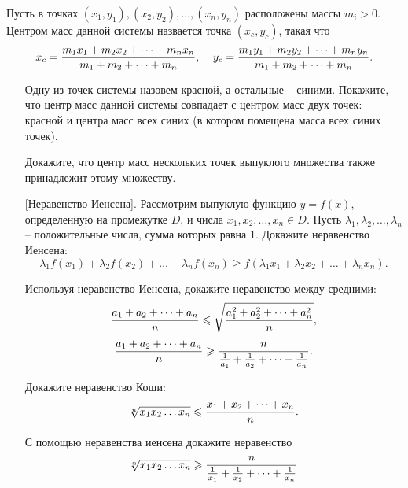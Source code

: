 \documentclass[a4paper,12pt,leqno]{article}
\begin{document}
	\begin{definition}
		Пусть в точках $(x_1, y_1), (x_2, y_2), \dots , (x_n, y_n)$ расположены массы $m_i > 0$. Центром масс данной системы назвается точка $(x_c, y_c)$, такая что
		$$x_c = {m_1x_1 + m_2x_2 + \dots + m_nx_n \over m_1 + m_2 + \dots + m_n},\;\;\;\; y_c = {m_1y_1 + m_2y_2 + \dots + m_ny_n \over m_1 + m_2 + \dots + m_n}.$$
	\end{definition}

	\begin{enumerate}
		\item[\z]  Одну из точек системы назовем красной, а остальные -- синими. Покажите, что центр масс данной системы совпадает с центром масс двух точек: красной и центра масс всех синих (в котором помещена масса всех синих точек).
		\item[\z] Докажите, что центр масс нескольких точек выпуклого множества также принадлежит этому множеству.
		\item[\z] [Неравенство Иенсена]. Рассмотрим выпуклую функцию $y = f(x)$, определенную на промежутке $D$, и числа $x_1, x_2, \dots , x_n \in D$. Пусть $\lambda_1, \lambda_2, \dots , \lambda_n$ -- положительные числа, сумма которых равна 1. Докажите неравенство Иенсена:
			$$\lambda_1f(x_1) + \lambda_2f(x_2) + \dots + \lambda_nf(x_n) \geqslant f(\lambda_1x_1 + \lambda_2x_2 + \dots + \lambda_nx_n).$$ 
		\item[\z] Используя неравенство Иенсена, докажите неравенство между средними:
		$${a_1+a_2+ \dots + a_n \over n} \leqslant \sqrt{ {a_1^2 + a_2^2 + \dots + a_n^2 \over n}  },$$
		$${a_1+a_2 + \dots + a_n \over n} \geqslant {n \over {1\over a_1} + {1 \over a_2} + \dots + {1\over a_n}}.$$ 	
		\item[\z] Докажите неравенство Коши:
					$$\sqrt[n]{x_1x_2 \dots x_n} \leqslant {x_1+x_2+\dots +x_n \over n}.$$
		\item[\z] С помощью неравенства иенсена докажите неравенство
		$$\sqrt[n]{x_1x_2\dots x_n} \geqslant {n \over \frac{1}{x_1} + \frac{1}{x_2} + \dots + \frac{1}{x_n}}$$  
	\end{enumerate}
\end{document}
